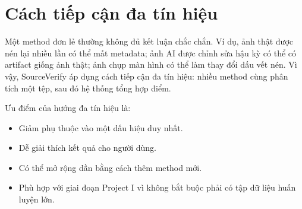 \section{Cách tiếp cận đa tín hiệu}
Một method đơn lẻ thường không đủ kết luận chắc chắn. Ví dụ, ảnh thật được nén lại nhiều lần có thể mất metadata; ảnh AI được chỉnh sửa hậu kỳ có thể có artifact giống ảnh thật; ảnh chụp màn hình có thể làm thay đổi dấu vết nén. Vì vậy, SourceVerify áp dụng cách tiếp cận đa tín hiệu: nhiều method cùng phân tích một tệp, sau đó hệ thống tổng hợp điểm.

Ưu điểm của hướng đa tín hiệu là:
\begin{itemize}
  \item Giảm phụ thuộc vào một dấu hiệu duy nhất.
  \item Dễ giải thích kết quả cho người dùng.
  \item Có thể mở rộng dần bằng cách thêm method mới.
  \item Phù hợp với giai đoạn Project I vì không bắt buộc phải có tập dữ liệu huấn luyện lớn.
\end{itemize}

